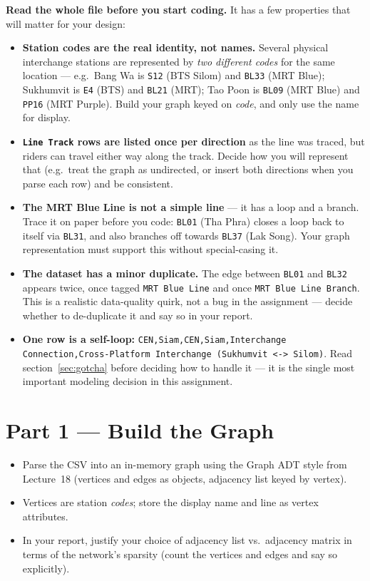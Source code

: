 \documentclass[11pt,a4paper]{article}
\begin{document}
\medskip
\noindent\textbf{Read the whole file before you start coding.} It has a few
properties that will matter for your design:

\begin{itemize}
  \item \textbf{Station codes are the real identity, not names.} Several
        physical interchange stations are represented by \emph{two different
        codes} for the same location --- e.g.\ Bang Wa is \texttt{S12} (BTS
        Silom) and \texttt{BL33} (MRT Blue); Sukhumvit is \texttt{E4} (BTS)
        and \texttt{BL21} (MRT); Tao Poon is \texttt{BL09} (MRT Blue) and
        \texttt{PP16} (MRT Purple). Build your graph keyed on \emph{code},
        and only use the name for display.
  \item \textbf{\texttt{Line Track} rows are listed once per direction} as
        the line was traced, but riders can travel either way along the
        track. Decide how you will represent that (e.g.\ treat the graph as
        undirected, or insert both directions when you parse each row) and
        be consistent.
  \item \textbf{The MRT Blue Line is not a simple line} --- it has a loop
        and a branch. Trace it on paper before you code: \texttt{BL01} (Tha
        Phra) closes a loop back to itself via \texttt{BL31}, and also
        branches off towards \texttt{BL37} (Lak Song). Your graph
        representation must support this without special-casing it.
  \item \textbf{The dataset has a minor duplicate.} The edge between
        \texttt{BL01} and \texttt{BL32} appears twice, once tagged
        \texttt{MRT Blue Line} and once \texttt{MRT Blue Line Branch}. This
        is a realistic data-quality quirk, not a bug in the assignment ---
        decide whether to de-duplicate it and say so in your report.
  \item \textbf{One row is a self-loop:}
        \texttt{CEN,Siam,CEN,Siam,Interchange Connection,Cross-Platform
        Interchange (Sukhumvit <-> Silom)}. Read section~\ref{sec:gotcha}
        before deciding how to handle it --- it is the single most
        important modeling decision in this assignment.
\end{itemize}

\section{Part 1 --- Build the Graph}
\begin{itemize}
  \item Parse the CSV into an in-memory graph using the Graph ADT style from
        Lecture~18 (vertices and edges as objects, adjacency list keyed by
        vertex).
  \item Vertices are station \emph{codes}; store the display name and line
        as vertex attributes.
  \item In your report, justify your choice of adjacency list vs.\
        adjacency matrix in terms of the network's sparsity (count the
        vertices and edges and say so explicitly).
\end{itemize}
\end{document}
